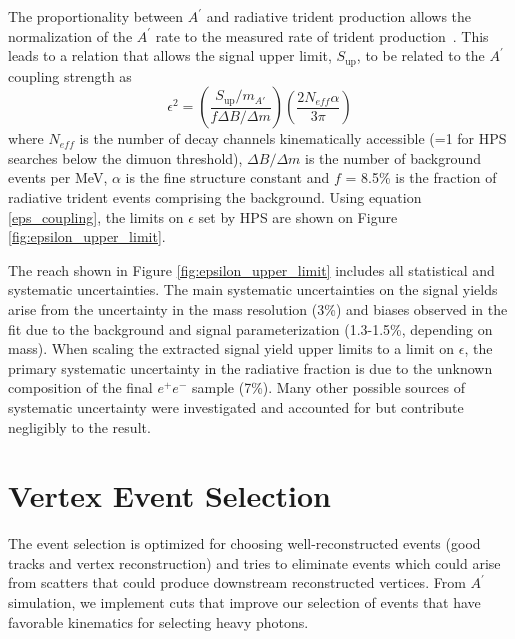 \documentclass[twocolumn, showpacs, preprintnumbers,prd, superscriptaddress]{revtex4-1}
\newcommand{\pos}{e^{+}}
\newcommand{\ele}{e^{-}}
\newcommand{\epem}{\pos\ele}
\newcommand{\aprime}{A^\prime}
\begin{document}
        The proportionality between $\aprime$ and radiative trident 
        production allows the normalization of the $\aprime$ rate to the 
        measured rate of trident production~\cite{Bjorken:2009mm}.  This leads
        to a relation that allows the signal upper limit, $S_{\text{up}}$, to be 
        related to the $\aprime$ coupling strength as 
        \begin{equation} \label{eps_coupling}
            \epsilon^2 = \left (\frac{S_{\text{up}}/m_{A'}}{
                    f\Delta B/\Delta m} \right) 
                    \left(\frac{2 N_{eff} \alpha}{3 \pi} \right)
        \end{equation}
        where $N_{eff}$ is the number of decay channels kinematically accessible
        (=1 for HPS searches below the dimuon threshold), $\Delta B/\Delta m$
        is the number of background events per MeV, $\alpha$ is the fine structure
        constant and $f$ = 8.5\% is the 
        fraction of radiative trident events comprising the background.  Using
        equation \ref{eps_coupling}, the limits on $\epsilon$ set by HPS are
        shown on Figure \ref{fig:epsilon_upper_limit}. 
        
        The reach shown in Figure \ref{fig:epsilon_upper_limit} includes all 
        statistical and  systematic uncertainties. The main systematic 
        uncertainties on the signal yields arise from the uncertainty in the mass
        resolution (3\%) and biases observed in the fit due to the background 
        and signal parameterization (1.3-1.5\%, depending on mass). When scaling
        the extracted signal yield upper limits to a limit on $\epsilon$, the
        primary systematic uncertainty in the radiative fraction is due to 
        the unknown composition of the final $\epem$ sample (7\%).  Many
        other possible sources of systematic uncertainty were investigated and
        accounted for but contribute negligibly to the result. 

    \section{Vertex Event Selection}\label{sec:vertexselection}
    
The event selection is optimized for choosing well-reconstructed events (good tracks and vertex reconstruction) and tries to eliminate events which could arise from scatters that could produce downstream reconstructed vertices. From $A^{\prime}$ simulation, we implement cuts that improve our selection of events that have favorable kinematics for selecting heavy photons. 
\end{document}
